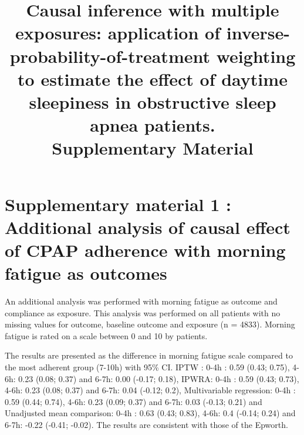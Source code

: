 \documentclass{article}
\title{Causal inference with multiple exposures: application of inverse-probability-of-treatment weighting to estimate the effect of daytime sleepiness in obstructive sleep apnea patients. \\
  Supplementary Material}
\author{}
\date{}
\begin{document}
\maketitle





\clearpage
\section*{Supplementary material 1 : Additional analysis of causal effect of CPAP adherence with morning fatigue as outcomes}
An additional analysis was performed with morning fatigue as outcome and compliance as exposure.
This analysis was performed on all patients with no missing values for outcome, baseline outcome and exposure (n = 4833).
Morning fatigue is rated on a scale between 0 and 10 by patients.

The results are presented as the difference in morning fatigue scale compared to the most adherent group (7-10h) with 95\% CI. IPTW : 0-4h : 0.59 (0.43; 0.75), 4-6h: 0.23 (0.08; 0.37) and 6-7h:  0.00 (-0.17; 0.18), IPWRA: 0-4h : 0.59 (0.43; 0.73), 4-6h: 0.23 (0.08; 0.37) and 6-7h:  0.04 (-0.12; 0.2), Multivariable regression: 0-4h : 0.59 (0.44; 0.74), 4-6h: 0.23 (0.09; 0.37) and 6-7h:  0.03 (-0.13; 0.21) and Unadjusted mean comparison: 0-4h : 0.63 (0.43; 0.83), 4-6h: 0.4 (-0.14; 0.24) and 6-7h:  -0.22 (-0.41; -0.02). The results are consistent with those of the Epworth.


\clearpage
\end{document}
